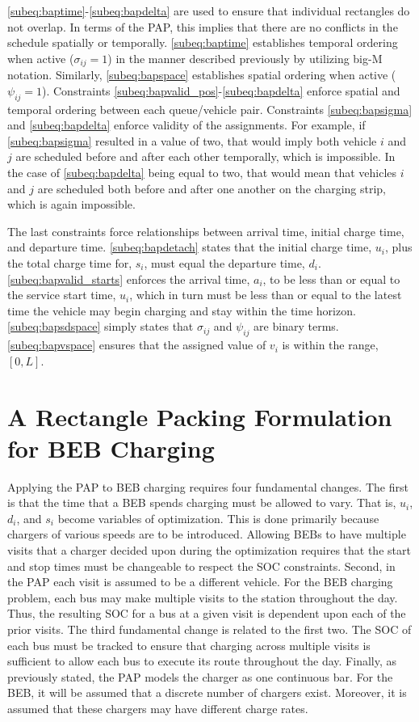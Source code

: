 \documentclass[utf8]{FrontiersinHarvard}
\begin{document}
\autoref{subeq:baptime}-\autoref{subeq:bapdelta} are used to ensure that individual rectangles do not overlap. In terms
of the PAP, this implies that there are no conflicts in the schedule spatially or temporally. \autoref{subeq:baptime}
establishes temporal ordering when active (\(\sigma_{ij}=1\)) in the manner described previously by utilizing big-M notation.
Similarly, \autoref{subeq:bapspace} establishes spatial ordering when active (\(\psi_{ij} =1\)). Constraints
\autoref{subeq:bapvalid_pos}-\autoref{subeq:bapdelta} enforce spatial and temporal ordering between each queue/vehicle
pair. Constraints \autoref{subeq:bapsigma} and \autoref{subeq:bapdelta} enforce validity of the assignments. For
example, if \autoref{subeq:bapsigma} resulted in a value of two, that would imply both vehicle \(i\) and \(j\) are scheduled
before and after each other temporally, which is impossible. In the case of \autoref{subeq:bapdelta} being equal to
two, that would mean that vehicles \(i\) and \(j\) are scheduled both before and after one another on the charging strip,
which is again impossible.

The last constraints force relationships between arrival time, initial charge time, and departure time.
\autoref{subeq:bapdetach} states that the initial charge time, \(u_i\), plus the total charge time for, \(s_i\), must equal
the departure time, \(d_i\). \autoref{subeq:bapvalid_starts} enforces the arrival time, \(a_i\), to be less than or equal to
the service start time, \(u_i\), which in turn must be less than or equal to the latest time the vehicle may begin
charging and stay within the time horizon. \autoref{subeq:bapsdspace} simply states that \(\sigma_{ij}\) and \(\psi_{ij}\) are
binary terms. \autoref{subeq:bapvspace} ensures that the assigned value of \(v_i\) is within the range, \([0,L]\).
\section{A Rectangle Packing Formulation for BEB Charging}
\label{sec:problemformulation}
Applying the PAP to BEB charging requires four fundamental changes. The first is that the time that a BEB spends
charging must be allowed to vary. That is, \(u_i\), \(d_i\), and \(s_i\) become variables of optimization. This is done
primarily because chargers of various speeds are to be introduced. Allowing BEBs to have multiple visits that a charger
decided upon during the optimization requires that the start and stop times must be changeable to respect the SOC
constraints. Second, in the PAP each visit is assumed to be a different vehicle. For the BEB charging problem, each bus
may make multiple visits to the station throughout the day. Thus, the resulting SOC for a bus at a given visit is
dependent upon each of the prior visits. The third fundamental change is related to the first two. The SOC of each bus
must be tracked to ensure that charging across multiple visits is sufficient to allow each bus to execute its route
throughout the day. Finally, as previously stated, the PAP models the charger as one continuous bar. For the BEB, it
will be assumed that a discrete number of chargers exist. Moreover, it is assumed that these chargers may have different
charge rates.
\end{document}
